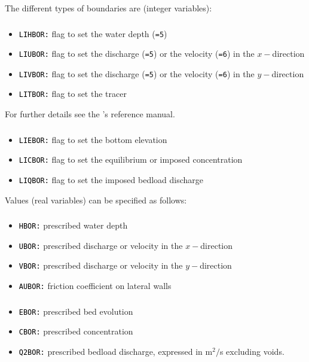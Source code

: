 {The different types of boundaries are (integer variables):
\subsubsection{}
\begin{itemize}
\item \texttt{\textcolor{black}{LIHBOR:}} flag to set the water depth (\texttt{=5})
\item \texttt{\textcolor{black}{LIUBOR:}} flag to set the discharge (\texttt{=5}) or the velocity (\texttt{=6}) in the $x-$direction
\item \texttt{\textcolor{black}{LIVBOR:}} flag to set the discharge (\texttt{=5}) or the velocity (\texttt{=6}) in the $y-$direction
\item \texttt{\textcolor{black}{LITBOR:}} flag to set the tracer  
\end{itemize}
For further details see the 's reference manual.
\subsubsection{\sisyphe{}}
\begin{itemize}
\item \texttt{\textcolor{black}{LIEBOR:}} flag to set the bottom elevation 
\item \texttt{\textcolor{black}{LICBOR:}} flag to set the equilibrium or imposed concentration 
  \item \texttt{\textcolor{black}{LIQBOR:}} flag to set the imposed bedload discharge 
\end{itemize}

Values (real variables) can be specified as follows:
\subsubsection{}
\begin{itemize}
\item \texttt{\textcolor{black}{HBOR:}} prescribed water depth 
\item \texttt{\textcolor{black}{UBOR:}} prescribed discharge or velocity in the $x-$direction
\item \texttt{\textcolor{black}{VBOR:}} prescribed discharge or velocity in the $y-$direction
\item \texttt{\textcolor{black}{AUBOR:}} friction coefficient on lateral walls 
\end{itemize}
\subsubsection{\sisyphe{}}
\begin{itemize}
\item \texttt{\textcolor{black}{EBOR:}} prescribed bed evolution
\item \texttt{\textcolor{black}{CBOR:}} prescribed concentration
\item \texttt{\textcolor{black}{Q2BOR:}} prescribed bedload discharge, expressed in m$^2/$s excluding voids. 
\end{itemize}  

}
